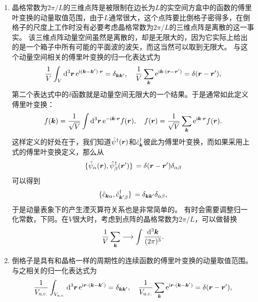 \documentclass[hyperref, UTF8, a4paper]{ctexart}
\newcommand*{\ii}{\mathrm{i}}
\newcommand*{\ee}{\mathrm{e}}
\begin{document}
\begin{enumerate}
    \item 晶格常数为$2\pi / L$的三维点阵是被限制在边长为$L$的实空间方盒中的函数的傅里叶变换的动量取值范围，由于$L$通常很大，这个点阵要比倒格子密得多，在倒格子的尺度上工作时没有必要考虑晶格常数为$2\pi / L$的三维点阵是离散的这一事实。
    该三维点阵动量空间虽然是离散的，却是无限大的，因为它实际上给出的是一个箱子中所有可能的平面波的波矢，而这当然可以取到无限大。
    与这个动量空间相关的傅里叶变换的归一化表达式为
    \begin{equation}
        \frac{1}{V} \int_V \dd[3]{\vb*{r}} \ee^{\ii (\vb*{k} - \vb*{k}') \cdot \vb*{r}} = \delta_{\vb*{k} \vb*{k}'}, \quad \frac{1}{V} \sum_{\vb*{k}} \ee^{\ii \vb*{k} \cdot (\vb*{r} - \vb*{r}')} = \delta(\vb*{r} - \vb*{r}'),
    \end{equation}
    第二个表达式中的$\delta$函数就是动量空间无限大的一个结果。于是通常如此定义傅里叶变换：
    \begin{equation}
        f(\vb*{k}) = \frac{1}{\sqrt{V}} \int \dd[3]{\vb*{r}} \ee^{- \ii \vb*{k} \cdot \vb*{r}} f(\vb*{r}), \quad f(\vb*{r}) = \frac{1}{\sqrt{V}} \sum_{\vb*{k}} \ee^{\ii \vb*{k} \cdot \vb*{r}} f(\vb*{r}).
    \end{equation}
    这样定义的好处在于，我们知道$\hat{\psi}^\dagger(\vb*{r})$和$\hat{c}^\dagger_{\vb*{k}}$彼此为傅里叶变换，而如果采用上式的傅里叶变换定义，那么从
    \[
        \acomm*{\hat{\psi}_\alpha(\vb*{r})}{\hat{\psi}^\dagger_\beta(\vb*{r}')} = \delta(\vb*{r}-\vb*{r}') \delta_{\alpha \beta}
    \]
    可以得到
    \[
        \acomm*{\hat{c}_{\vb*{k}\alpha}}{\hat{c}^\dagger_{\vb*{k}' \beta}} = \delta_{\vb*{k} \vb*{k}'} \delta_{\alpha \beta},
    \]
    于是动量表象下的产生湮灭算符关系也是非常简单的。
    有时会需要调整归一化常数，下同。在$V$很大时，考虑到点阵的晶格常数为$2\pi / L$，可以做替换
    \begin{equation}
        \frac{1}{V} \sum_{\vb*{k}} \longrightarrow \int \frac{\dd[3]{\vb*{k}}}{(2\pi)^3}.
    \end{equation}
    \item 倒格子是具有和晶格一样的周期性的连续函数的傅里叶变换的动量取值范围。与之相关的归一化表达式为
    \begin{equation}
        \frac{1}{V_\text{u.c.}} \int_{V_\text{u.c.}} \dd[3]{\vb*{r}} \ee^{\ii \vb*{r} \cdot (\vb*{k} - \vb*{k}')} = \delta_{\vb*{k} \vb*{k}'}, \quad \frac{1}{V_\text{u.c.}} \sum_{\vb*{k}} \ee^{\ii \vb*{r} \cdot (\vb*{k} - \vb*{k}')} = \delta(\vb*{r} - \vb*{r}'), 
        \label{eq:normalization-periodic}
    \end{equation}

\end{enumerate}
\end{document}
